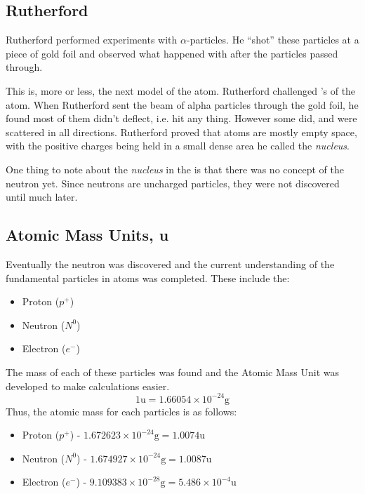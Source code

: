 \subsection{Rutherford} \label{subsec:Rutherford}
Rutherford performed experiments with $\alpha$-particles.
He ``shot'' these particles at a piece of gold foil and observed what happened with after the particles passed through.

\begin{definition} \label{def:Rutherford Model}
  This is, more or less, the next model of the atom.
  Rutherford challenged 's  of the atom.
  When Rutherford sent the beam of alpha particles through the gold foil, he found most of them didn't deflect, i.e. hit any thing.
  However some did, and were scattered in all directions.
  Rutherford proved that atoms are mostly empty space, with the positive charges being held in a small dense area he called the \emph{nucleus}.
  \begin{remark}
    One thing to note about the \emph{nucleus} in the  is that there was no concept of the neutron yet.
    Since neutrons are uncharged particles, they were not discovered until much later.
  \end{remark}
\end{definition}

\subsection{Atomic Mass Units, \si{\atomicmassunit}} \label{subsec:AMU}
Eventually the neutron was discovered and the current understanding of the fundamental particles in atoms was completed.
These include the:
\begin{itemize}[noitemsep, nolistsep]
  \item Proton ($p^{+}$)
  \item Neutron ($N^{0}$)
  \item Electron ($e^{-}$)
\end{itemize}

The mass of each of these particles was found and the Atomic Mass Unit was developed to make calculations easier.
\begin{equation} \label{eq:AMU Equivalency}
  1 \si{\atomicmassunit} = 1.66054 \times 10^{-24} \si{\gram}
\end{equation}
Thus, the atomic mass for each particles is as follows:
\begin{itemize}[noitemsep, nolistsep]
  \item Proton ($p^{+}$) - $1.672623 \times 10^{-24} \si{\gram} = 1.0074 \si{\atomicmassunit}$
  \item Neutron ($N^{0}$) - $1.674927 \times 10^{-24} \si{\gram} = 1.0087 \si{\atomicmassunit}$
  \item Electron ($e^{-}$) - $9.109383 \times 10^{-28} \si{\gram} = 5.486 \times 10^{-4} \si{\atomicmassunit}$
\end{itemize}